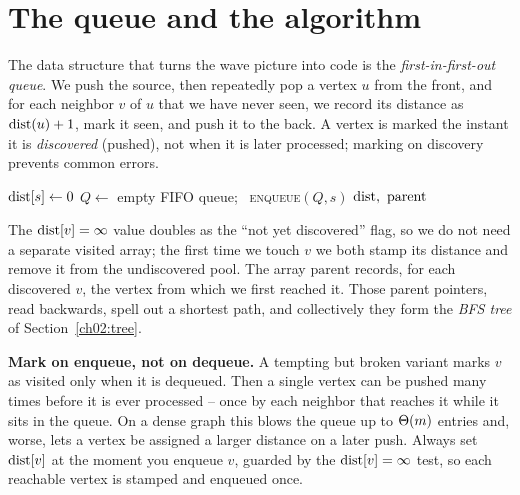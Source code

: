 \section{The queue and the algorithm}
\label{ch02:queue}

The data structure that turns the wave picture into code is the
\emph{first-in-first-out queue}. We push the source, then repeatedly pop a vertex
$u$ from the front, and for each neighbor $v$ of $u$ that we have never seen, we
record its distance as $\operatorname{dist}(u)+1$, mark it seen, and push it to the back. A
vertex is marked the instant it is \emph{discovered} (pushed), not when it is
later processed; marking on discovery prevents common errors.

\begin{algorithm}[H]
\DontPrintSemicolon
{}
$\operatorname{dist}[s]\gets 0$\;
$Q \gets$ empty FIFO queue; \ \textsc{enqueue}$(Q,s)$\;
\Return $\operatorname{dist},\ \mathrm{parent}$\;
\caption{\textsc{Bfs}$(\Gph,s)$ -- breadth-first search from a single source}
\label{ch02:alg-bfs}
\end{algorithm}

The $\operatorname{dist}[v]=\infty$ value doubles as the ``not yet discovered'' flag, so we
do not need a separate visited array; the first time we touch $v$ we both stamp
its distance and remove it from the undiscovered pool. The array
$\mathrm{parent}$ records, for each discovered $v$, the vertex from which we first
reached it. Those parent pointers, read backwards, spell out a shortest path, and
collectively they form the \emph{BFS tree} of Section~\ref{ch02:tree}.

\begin{trapbox}
\textbf{Mark on enqueue, not on dequeue.} A tempting but broken variant marks
$v$ as visited only when it is dequeued. Then a single vertex can be pushed many
times before it is ever processed -- once by each neighbor that reaches it while
it sits in the queue. On a dense graph this blows the queue up to $\Theta(m)$
entries and, worse, lets a vertex be assigned a larger distance on a later push.
Always set $\operatorname{dist}[v]$ at the moment you enqueue $v$, guarded by the
$\operatorname{dist}[v]=\infty$ test, so each reachable vertex is stamped and enqueued once.
\end{trapbox}

